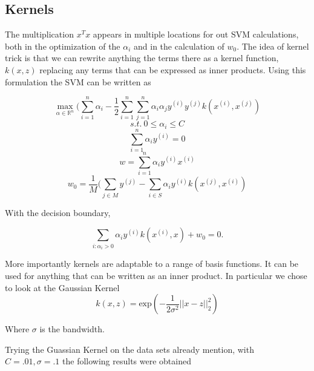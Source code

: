 \documentclass[10pt,twocolumn]{article}
\begin{document}
\subsection*{Kernels}

The multiplication $x^Tx$ appears in multiple locations for out SVM calculations, both in  the optimization of the $\alpha_i$ and in the calculation of $w_0$. The idea of kernel trick is that we can rewrite anything the terms there as a kernel function, $k(x,z)$ replacing any terms that can be expressed as inner products. Using this formulation the SVM can be written as 

\begin{equation}
\max_{\alpha \in \mathbb{R}^n} ( \sum_{i=1}^n \alpha_i - \frac{1}{2} \sum_{i=1}^n \sum_{j=1}^n \alpha_i \alpha_j y^{(i)} y^{(j)} k(x^{(i)},x^{(j)})
\end{equation}
\begin{equation}
s.t. \: 0 \leq \alpha_i \leq C
\end{equation}
\begin{equation}
\sum_{i=1}^n \alpha_i y^{(i)} =0
\end{equation}
\begin{equation}
w= \sum_{i=1}^n \alpha_i y^{(i)}x^{(i)}
\end{equation}  
\begin{equation}
w_0= \frac{1}{M} ( \sum_{j \in M} y^{(j)} - \sum_{i \in S} \alpha_i y^{(i)}k(x^{(j)},x^{(i)})
\end{equation}

With the decision boundary, 

\begin{equation}
\sum_{i:\alpha_i > 0} \alpha_i y^{(i)}k(x^{(i)}, x) + w_0 = 0.
\end{equation}

 More importantly kernels are adaptable to a range of basis functions. It can be used for anything that can be written as an inner product. In particular we chose to look at the Gaussian Kernel
 \begin{equation}
 k(x,z)= \textrm{exp}(-\frac{1}{2\sigma^2} ||x - z||_2^2)
\end{equation}

Where $\sigma$ is the bandwidth.

Trying the Guassian Kernel on the data sets already mention, with $C= .01, \sigma =.1$ the following results were obtained
\end{document}
